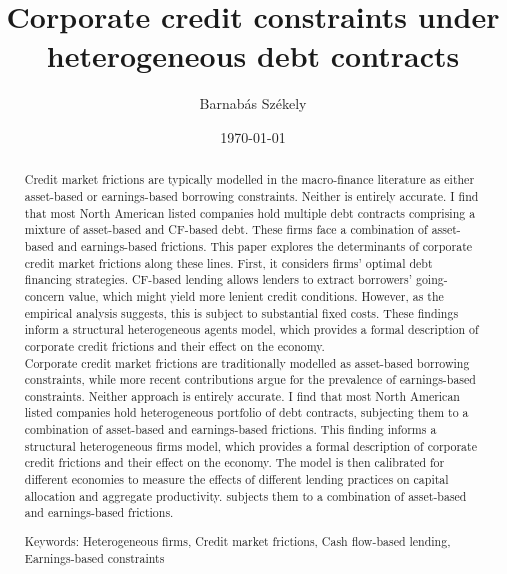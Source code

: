 \documentclass[12pt]{article}
\title{Corporate credit constraints under heterogeneous debt contracts}
\date{}
\begin{document}
\author{Barnabás Székely}
\date{\today}
\vspace{-1in}

\maketitle

\begin{abstract}
\noindent
Credit market frictions are typically modelled in the macro-finance literature as either asset-based or earnings-based borrowing constraints. Neither is entirely accurate. I find that most North American listed companies hold multiple debt contracts comprising a mixture of asset-based and CF-based debt. These firms face a combination of asset-based and earnings-based frictions. This paper explores the determinants of corporate credit market frictions along these lines. First, it considers firms' optimal debt financing strategies. CF-based lending allows lenders to extract borrowers' going-concern value, which might yield more lenient credit conditions. However, as the empirical analysis suggests, this is subject to substantial fixed costs. These findings inform a structural heterogeneous agents model, which provides a formal description of corporate credit frictions and their effect on the economy. \vspace{3mm} \\
Corporate credit market frictions are traditionally modelled as asset-based borrowing constraints, while more recent contributions argue for the prevalence of earnings-based constraints. Neither approach is entirely accurate. I find that most North American listed companies hold heterogeneous portfolio of debt contracts, subjecting them to a combination of asset-based and earnings-based frictions. This finding informs a structural heterogeneous firms model, which provides a formal description of corporate credit frictions and their effect on the economy. The model is then calibrated for different economies to measure the effects of different lending practices on capital allocation and aggregate productivity. subjects them to a combination of asset-based and earnings-based frictions. 

\bigskip{}
\bigskip{}

Keywords: Heterogeneous firms, Credit market frictions, Cash flow-based lending, Earnings-based constraints

\medskip{}
\end{abstract}
\thispagestyle{empty}
\end{document}
